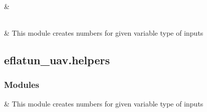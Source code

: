 \documentclass[letterpaper,10pt,english]{sphinxmanual}
\begin{document}
\begin{savenotes}\sphinxattablestart
\sphinxthistablewithglobalstyle
\sphinxthistablewithnovlinesstyle
\centering
\begin{tabulary}{\linewidth}[t]{}
\sphinxtoprule
\sphinxtableatstartofbodyhook
\sphinxAtStartPar
{\hyperref[\detokenize{generated/eflatun_uav.helpers:module-eflatun_uav.helpers}]{}}
&
\sphinxAtStartPar

\\
\sphinxhline
\sphinxAtStartPar
{\hyperref[\detokenize{generated/eflatun_uav.number_generators:module-eflatun_uav.number_generators}]{}}
&
\sphinxAtStartPar
This module creates numbers for given variable type of inputs
\\
\sphinxbottomrule
\end{tabulary}
\sphinxtableafterendhook\par
\sphinxattableend\end{savenotes}

\sphinxstepscope


\subsection{eflatun\_uav.helpers}
\label{\detokenize{generated/eflatun_uav.helpers:module-eflatun_uav.helpers}}\label{\detokenize{generated/eflatun_uav.helpers:eflatun-uav-helpers}}\label{\detokenize{generated/eflatun_uav.helpers::doc}}\subsubsection*{Modules}


\begin{savenotes}\sphinxattablestart
\sphinxthistablewithglobalstyle
\sphinxthistablewithnovlinesstyle
\centering
\begin{tabulary}{\linewidth}[t]{}
\sphinxtoprule
\sphinxtableatstartofbodyhook
\sphinxAtStartPar
{\hyperref[\detokenize{generated/eflatun_uav.helpers.number_generators:module-eflatun_uav.helpers.number_generators}]{}}
&
\sphinxAtStartPar
This module creates numbers for given variable type of inputs
\\
\sphinxbottomrule
\end{tabulary}
\sphinxtableafterendhook\par
\sphinxattableend\end{savenotes}
\end{document}
